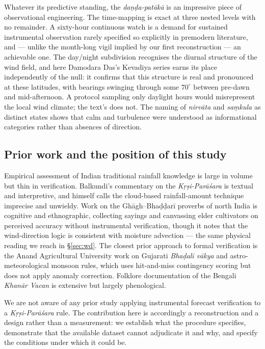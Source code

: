 \documentclass[11pt,a4paper]{article}
\newcommand{\skt}[1]{\textcolor{skt}{\textit{#1}}}
\begin{document}
Whatever its predictive standing, the \skt{daṇḍa-patākā} is an impressive piece of observational engineering. The time-mapping is exact at three nested levels with no remainder. A sixty-hour continuous watch is a demand for sustained instrumental observation rarely specified so explicitly in premodern literature, and --- unlike the month-long vigil implied by our first reconstruction --- an achievable one. The day/night subdivision recognises the diurnal structure of the wind field, and here Damodara Das's Kevadiya series earns its place independently of the null: it confirms that this structure is real and pronounced at these latitudes, with bearings swinging through some $70^\circ$ between pre-dawn and mid-afternoon. A protocol sampling only daylight hours would misrepresent the local wind climate; the text's does not. The naming of \skt{nirvāta} and \skt{saṃkula} as distinct states shows that calm and turbulence were understood as informational categories rather than absences of direction.

\subsection{Prior work and the position of this study}

Empirical assessment of Indian traditional rainfall knowledge is large in volume but thin in verification. Balkundi's commentary on the \skt{Kṛṣi-Parāśara} is textual and interpretive, and himself calls the cloud-based rainfall-amount technique imprecise and unwieldy. Work on the Ghāgh--Bhaḍḍarī proverbs of north India is cognitive and ethnographic, collecting sayings and canvassing elder cultivators on perceived accuracy without instrumental verification, though it notes that the wind-direction logic is consistent with moisture advection --- the same physical reading we reach in \S\ref{sec:wd}. The closest prior approach to formal verification is the Anand Agricultural University work on Gujarati \skt{Bhaḍalī vākya} and astro-meteorological monsoon rules, which uses hit-and-miss contingency scoring \cite{vaidya} but does not apply anomaly correction. Folklore documentation of the Bengali \skt{Khanār Vacan} is extensive but largely phenological.

We are not aware of any prior study applying instrumental forecast verification to a \skt{Kṛṣi-Parāśara} rule. The contribution here is accordingly a reconstruction and a design rather than a measurement: we establish what the procedure specifies, demonstrate that the available dataset cannot adjudicate it and why, and specify the conditions under which it could be.
\end{document}
